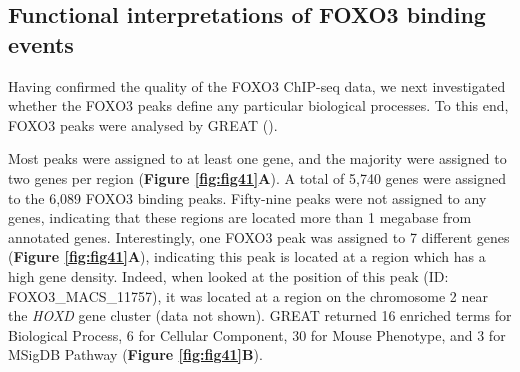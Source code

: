 \subsection{Functional interpretations of FOXO3 binding events}

Having confirmed the quality of the FOXO3 ChIP-seq data, we next investigated whether the FOXO3 peaks define any particular biological processes. To this end, FOXO3 peaks were analysed by GREAT (\cite{mclean2010great}).

Most peaks were assigned to at least one gene, and the majority were assigned to two genes per region (\textbf{Figure \ref{fig:fig41}A}). A total of 5,740 genes were assigned to the 6,089 FOXO3 binding peaks. Fifty-nine peaks were not assigned to any genes, indicating that these regions are located more than 1 megabase from annotated genes. Interestingly, one FOXO3 peak was assigned to 7 different genes (\textbf{Figure \ref{fig:fig41}A}), indicating this peak is located at a region which has a high gene density. Indeed, when looked at the position of this peak (ID: FOXO3\_MACS\_11757), it was located at a region on the chromosome 2 near the \textit{HOXD} gene cluster (data not shown). GREAT returned 16 enriched terms for Biological Process, 6 for Cellular Component, 30 for Mouse Phenotype, and 3 for MSigDB Pathway (\textbf{Figure \ref{fig:fig41}B}).

